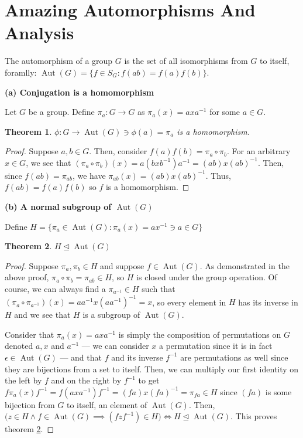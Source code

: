 \documentclass[12pt]{article}
\newcommand{\Aut}{\operatorname{Aut}}
\newtheorem{thm}{Theorem}
\begin{document}
\section{Amazing Automorphisms And Analysis}

The automorphism of a group $G$ is the set of all isomorphisms from $G$ to itself,
foramlly: $\Aut(G) = \{ f \in S_G: f(ab) = f(a)f(b) \}$.

\medskip
\noindent
\textbf{(a) Conjugation is a homomorphism}

Let $G$ be a group.
Define $\pi_a: G \to G$ as $\pi_a(x) = axa^{-1}$ for some $a \in G$.

\begin{thm} \label{thm12}
	$\phi: G \to \Aut(G) \ni \phi(a) = \pi_a$ is a homomorphism.
\end{thm}

\begin{proof}
	Suppose $a,b \in G$.
	Then, consider $f(a)f(b) = \pi_a \circ \pi_b$.
	For an arbitrary $x \in G$,
	we see that $(\pi_a \circ \pi_b)(x) = a(bxb^{-1})a^{-1} = (ab)x(ab)^{-1}$.
	Then, since $f(ab) = \pi_{ab}$, we have $\pi_{ab}(x) = (ab)x(ab)^{-1}$.
	Thus, $f(ab) = f(a)f(b)$ so $f$ is a homomorphism.
\end{proof}

\medskip
\noindent
\textbf{(b) A normal subgroup of $\Aut(G)$}

Define $H = \{\pi_a \in \Aut(G): \pi_a(x) = ax^{-1} \ni a \in G \}$

\begin{thm} \label{thm13}
	$H \trianglelefteq \Aut(G)$
\end{thm}

\begin{proof}
	Suppose $\pi_a, \pi_b \in H$ and suppose $f \in \Aut(G)$.
	As demonstrated in the above proof, $\pi_a \circ \pi_b = \pi_{ab} \in H$,
	so $H$ is closed under the group operation.
	Of course, we can always find a $\pi_{a^{-1}} \in H$
	such that $(\pi_a \circ \pi_{a^{-1}})(x) = aa^{-1}x(aa^{-1})^{-1} = x$,
	so every element in $H$ has its inverse in $H$
	and we see that $H$ is a subgroup of $\Aut(G)$.

	Consider that $\pi_a(x) = axa^{-1}$ is simply the composition
	of permutations on $G$ denoted $a,x$ and $a^{-1}$ ---
	we can consider $x$ a permutation since it is in fact $\epsilon \in \Aut(G)$ ---
	and that $f$ and its inverse $f^{-1}$ are permutations as well
	since they are bijections from a set to itself.
	Then, we can multiply our first identity
	on the left by $f$
	and on the right by $f^{-1}$
	to get $f\pi_a(x)f^{-1} = f(axa^{-1})f^{-1} = (fa)x(fa)^{-1} = \pi_{fa} \in H$
	since $(fa)$ is some bijection from $G$ to itself, an element of $\Aut(G)$.
	Then, $\Big(z \in H \land f \in \Aut(G) \implies (fzf^{-1}) \in H\Big) \iff H \trianglelefteq \Aut(G)$.
	This proves theorem \ref{thm13}.
\end{proof}
\end{document}
